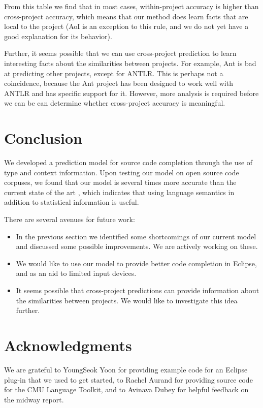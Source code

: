 \documentclass{article} %
\begin{document}
From this table we find that in most cases, within-project accuracy is higher than cross-project accuracy, which means that our method does learn facts that are local to the project (AoI is an exception to this rule, and we do not yet have a good explanation for its behavior).

Further, it seems possible that we can use cross-project prediction to learn interesting facts about the similarities between projects. For example, Ant is bad at predicting other projects, except for ANTLR. This is perhaps not a coincidence, because the Ant project has been designed to work well with ANTLR and has specific support for it. However, more analysis is required before we can be can determine whether cross-project accuracy is meaningful.


\section*{Conclusion}

We developed a prediction model for source code completion through the use of type and context information. Upon testing our model on open source code corpuses, we found that our model is several times more accurate than the current state of the art \cite{Hindle:2012:NS:2337223.2337322}, which indicates that using language semantics in addition to statistical information is useful.

There are several avenues for future work:
\begin{itemize}
  \item In the previous section we identified some shortcomings of our current model and discussed some possible improvements. We are actively working on these.
  \item We would like to use our model to provide better code completion in Eclipse, and as an aid to limited input devices.
  \item It seems possible that cross-project predictions can provide information about the similarities between projects. We would like to investigate this idea further.
\end{itemize}

\section*{Acknowledgments}

We are grateful to YoungSeok Yoon for providing example code for an Eclipse plug-in that we used to get started,  to Rachel Aurand for providing source code for the CMU Language Toolkit, and to Avinava Dubey for helpful feedback on the midway report.



\end{document}
